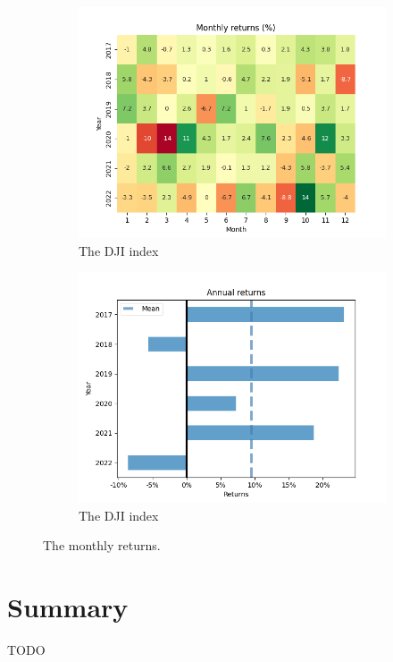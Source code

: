 \documentclass[../xlapes02]{subfiles}
\begin{document}
\begin{figure}[h!]
        \begin{subfigure}[t]{\experimentimgwidth\textwidth}
            \centering
            \includegraphics[width=\linewidth]{image/figure/monthly_returns_heatmap_dji}
            \caption{The DJI index}
        \end{subfigure}
        \hfill
        \begin{subfigure}[t]{\experimentimgwidth\textwidth}
            \centering
            \includegraphics[width=\linewidth]{image/figure/annual_returns_dji}
            \caption{The DJI index}
        \end{subfigure}

        \caption{The monthly returns.}
        \label{fig:month_annual_returns}
    \end{figure}



    \section{Summary}\label{sec:summary}
    TODO
\end{document}
